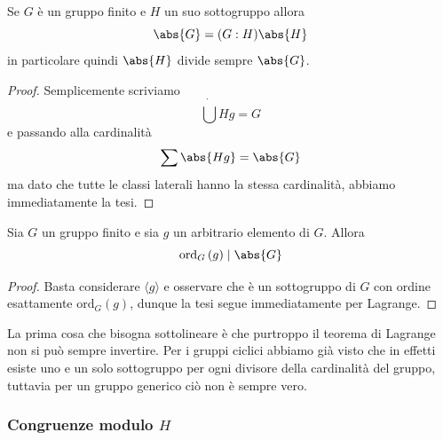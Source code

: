\documentclass[11pt]{scrartcl}
\newcommand{\ordine}[2]{\text{ord}_{#1}\left(#2\right)}
\begin{document}
	\begin{theorem}[Lagrange]
		Se $G$ è un gruppo finito e $H$ un suo sottogruppo allora
		$$\abs{G}=(G:H)\abs{H}$$
		in particolare quindi $\abs{H}$ divide sempre $ \abs{G}$.
	\end{theorem}
	\begin{proof}
		Semplicemente scriviamo
		$$\dot{\bigcup}Hg=G$$
		e passando alla cardinalità
		$$\sum\abs{Hg}=\abs{G}$$
		ma dato che tutte le classi laterali hanno la stessa cardinalità, abbiamo immediatamente la tesi.
	\end{proof}
	\begin{corollary}
		Sia $G$ un gruppo finito e sia $g$ un arbitrario elemento di $G$. Allora 
		$$\ordine{G}{g}\mid \abs{G}$$
	\end{corollary}
	\begin{proof}
		Basta considerare $\langle g \rangle$ e osservare che è un sottogruppo di $G$ con ordine esattamente $\ordine{G}{g}$, dunque la tesi segue immediatamente per Lagrange.
	\end{proof}
	La prima cosa che bisogna sottolineare è che purtroppo il teorema di Lagrange non si può sempre invertire. Per i gruppi ciclici abbiamo già visto che in effetti esiste uno e un solo sottogruppo per ogni divisore della cardinalità del gruppo, tuttavia per un gruppo generico ciò non è sempre vero.
	
	\subsubsection{Congruenze modulo $H$}
	
\end{document}
